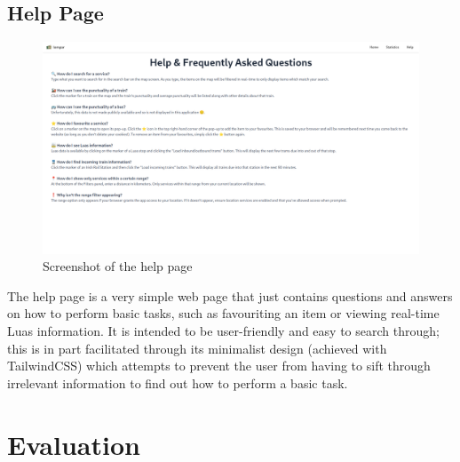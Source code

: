 \documentclass[a4paper,11pt]{report}
\begin{document}
\section{Help Page}
\begin{figure}[H]
    \centering
    \includegraphics[width=\textwidth]{./images/helppage.png}
    \caption{Screenshot of the help page}
\end{figure}

The help page is a very simple web page that just contains questions and answers on how to perform basic tasks, such as favouriting an item or viewing real-time Luas information.
It is intended to be user-friendly and easy to search through; 
this is in part facilitated through its minimalist design (achieved with TailwindCSS) which attempts to prevent the user from having to sift through irrelevant information to find out how to perform a basic task.

\chapter{Evaluation}
\end{document}
